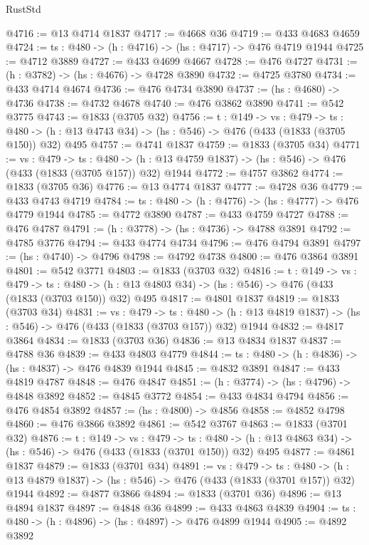 \begin{lexlean}{RustStd}
\begin{coremodule}
@4716 := @13 @4714 @1837
@4717 := @4668 @36
@4719 := @433 @4683 @4659
@4724 := {ts : @480} -> (h : @4716) -> (hs : @4717) -> @476 @4719 @1944
@4725 := @4712 @3889
@4727 := @433 @4699 @4667
@4728 := @476 @4727
@4731 := (h : @3782) -> (hs : @4676) -> @4728 @3890
@4732 := @4725 @3780
@4734 := @433 @4714 @4674
@4736 := @476 @4734 @3890
@4737 := (hs : @4680) -> @4736
@4738 := @4732 @4678
@4740 := @476 @3862 @3890
@4741 := @542 @3775
@4743 := @1833 (@3705 @32)
@4756 := {t : @149} ->
  {vs : @479} ->
  {ts : @480} -> (h : @13 @4743 @34) -> (hs : @546) -> @476 (@433 (@1833 (@3705 @150)) @32) @495
@4757 := @4741 @1837
@4759 := @1833 (@3705 @34)
@4771 := {vs : @479} ->
  {ts : @480} -> (h : @13 @4759 @1837) -> (hs : @546) -> @476 (@433 (@1833 (@3705 @157)) @32) @1944
@4772 := @4757 @3862
@4774 := @1833 (@3705 @36)
@4776 := @13 @4774 @1837
@4777 := @4728 @36
@4779 := @433 @4743 @4719
@4784 := {ts : @480} -> (h : @4776) -> (hs : @4777) -> @476 @4779 @1944
@4785 := @4772 @3890
@4787 := @433 @4759 @4727
@4788 := @476 @4787
@4791 := (h : @3778) -> (hs : @4736) -> @4788 @3891
@4792 := @4785 @3776
@4794 := @433 @4774 @4734
@4796 := @476 @4794 @3891
@4797 := (hs : @4740) -> @4796
@4798 := @4792 @4738
@4800 := @476 @3864 @3891
@4801 := @542 @3771
@4803 := @1833 (@3703 @32)
@4816 := {t : @149} ->
  {vs : @479} ->
  {ts : @480} -> (h : @13 @4803 @34) -> (hs : @546) -> @476 (@433 (@1833 (@3703 @150)) @32) @495
@4817 := @4801 @1837
@4819 := @1833 (@3703 @34)
@4831 := {vs : @479} ->
  {ts : @480} -> (h : @13 @4819 @1837) -> (hs : @546) -> @476 (@433 (@1833 (@3703 @157)) @32) @1944
@4832 := @4817 @3864
@4834 := @1833 (@3703 @36)
@4836 := @13 @4834 @1837
@4837 := @4788 @36
@4839 := @433 @4803 @4779
@4844 := {ts : @480} -> (h : @4836) -> (hs : @4837) -> @476 @4839 @1944
@4845 := @4832 @3891
@4847 := @433 @4819 @4787
@4848 := @476 @4847
@4851 := (h : @3774) -> (hs : @4796) -> @4848 @3892
@4852 := @4845 @3772
@4854 := @433 @4834 @4794
@4856 := @476 @4854 @3892
@4857 := (hs : @4800) -> @4856
@4858 := @4852 @4798
@4860 := @476 @3866 @3892
@4861 := @542 @3767
@4863 := @1833 (@3701 @32)
@4876 := {t : @149} ->
  {vs : @479} ->
  {ts : @480} -> (h : @13 @4863 @34) -> (hs : @546) -> @476 (@433 (@1833 (@3701 @150)) @32) @495
@4877 := @4861 @1837
@4879 := @1833 (@3701 @34)
@4891 := {vs : @479} ->
  {ts : @480} -> (h : @13 @4879 @1837) -> (hs : @546) -> @476 (@433 (@1833 (@3701 @157)) @32) @1944
@4892 := @4877 @3866
@4894 := @1833 (@3701 @36)
@4896 := @13 @4894 @1837
@4897 := @4848 @36
@4899 := @433 @4863 @4839
@4904 := {ts : @480} -> (h : @4896) -> (hs : @4897) -> @476 @4899 @1944
@4905 := @4892 @3892

\end{coremodule}
\end{lexlean}
